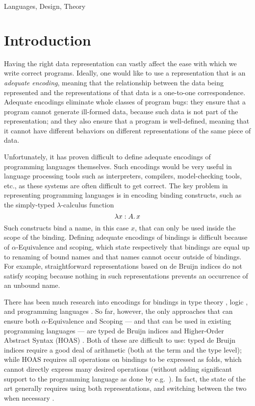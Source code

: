 \documentclass[natbib]{sigplanconf}
\begin{document}

\terms
Languages, Design, Theory



\section{Introduction}

Having the right data representation can vastly affect the ease with
which we write correct programs. Ideally, one would like to use a
representation that is an \emph{adequate encoding}, meaning that the
relationship between the data being represented and the
representations of that data is a one-to-one correspondence. Adequate
encodings eliminate whole classes of program bugs: they ensure that a
program cannot generate ill-formed data, because such data is not part
of the representation; and they also ensure that a program is
well-defined, meaning that it cannot have different behaviors on
different representations of the same piece of data.


Unfortunately, it has proven difficult to define adequate encodings
of programming languages themselves. Such encodings would be very
useful in language processing tools such as interpreters,
compilers, model-checking tools, etc., as these systems are often
difficult to get correct. The key problem in representing programming
languages is in encoding binding constructs, such as the
simply-typed $\lambda$-calculus function
\[
\lambda x:A.\, x
\]
Such constructs bind a name, in this case $x$, that can only be used
inside the scope of the binding. Defining adequate encodings of
bindings is difficult because of $\alpha$-Equivalence and scoping,
which state respectively that bindings are equal up to renaming of
bound names and that names cannot occur outside of bindings.  For
example, straightforward representations based on de Bruijn indices do
not satisfy scoping because nothing in such representations prevents
an occurrence of an unbound name.

There has been much research into encodings for bindings in type
theory \citep{licata09,poswolsky08,pientka08,urban07}, logic
\citep{miller05,gabbaypitts02}, and programming languages
\cite{pitts10,mcbride04}.  So far, however, the only approaches that
can ensure both $\alpha$-Equivalence and Scoping --- and that can be
used in existing programming languages --- are typed de Bruijn indices
\citep{sheard05,atkey09} and Higher-Order Abstract Syntax (HOAS)
\citep{pe88,meijer-hutton95,fegaras96,washburn03}.  Both of these are
difficult to use: typed de Bruijn indices require a good deal of
arithmetic (both at the term and the type level); while HOAS requires
all operations on bindings to be expressed as folds, which cannot
directly express many desired operations (without adding significant
support to the programming language as done by e.g.\
\citet{pientka08}). In fact, the state of the art generally requires
using both representations, and switching between the two when
necessary \citep{carette09,atkey09}.
\end{document}
